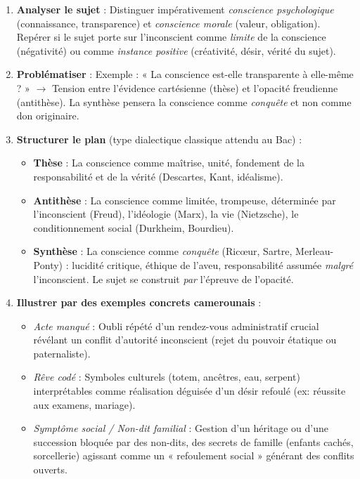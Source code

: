 \documentclass[11pt]{article}
\begin{document}
\begin{methode}
\begin{enumerate}
    \item \textbf{Analyser le sujet} : Distinguer impérativement \emph{conscience psychologique} (connaissance, transparence) et \emph{conscience morale} (valeur, obligation). Repérer si le sujet porte sur l'inconscient comme \emph{limite} de la conscience (négativité) ou comme \emph{instance positive} (créativité, désir, vérité du sujet).
    \item \textbf{Problématiser} : Exemple : « La conscience est-elle transparente à elle-même ? » $\rightarrow$ Tension entre l'évidence cartésienne (thèse) et l'opacité freudienne (antithèse). La synthèse pensera la conscience comme \emph{conquête} et non comme don originaire.
    \item \textbf{Structurer le plan} (type dialectique classique attendu au Bac) :
        \begin{itemize}
            \item \textbf{Thèse} : La conscience comme maîtrise, unité, fondement de la responsabilité et de la vérité (Descartes, Kant, idéalisme).
            \item \textbf{Antithèse} : La conscience comme limitée, trompeuse, déterminée par l'inconscient (Freud), l'idéologie (Marx), la vie (Nietzsche), le conditionnement social (Durkheim, Bourdieu).
            \item \textbf{Synthèse} : La conscience comme \emph{conquête} (Ricœur, Sartre, Merleau-Ponty) : lucidité critique, éthique de l'aveu, responsabilité assumée \emph{malgré} l'inconscient. Le sujet se construit \emph{par} l'épreuve de l'opacité.
        \end{itemize}
    \item \textbf{Illustrer par des exemples concrets camerounais} :
        \begin{itemize}
            \item \emph{Acte manqué} : Oubli répété d'un rendez-vous administratif crucial révélant un conflit d'autorité inconscient (rejet du pouvoir étatique ou paternaliste).
            \item \emph{Rêve codé} : Symboles culturels (totem, ancêtres, eau, serpent) interprétables comme réalisation déguisée d'un désir refoulé (ex: réussite aux examens, mariage).
            \item \emph{Symptôme social / Non-dit familial} : Gestion d'un héritage ou d'une succession bloquée par des non-dits, des secrets de famille (enfants cachés, sorcellerie) agissant comme un « refoulement social » générant des conflits ouverts.
        \end{itemize}
\end{enumerate}
\end{methode}
\end{document}
